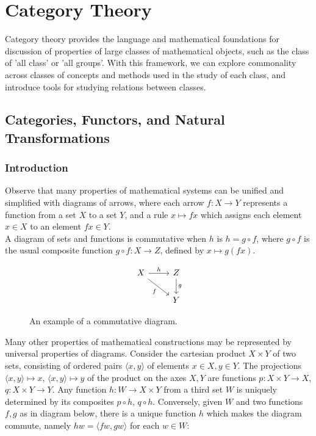 \section{Category Theory}

Category theory provides the language and mathematical foundations for discussion of properties of large classes of mathematical objects, such as the class of 'all class' or 'all groups'. With this framework, we can explore commonality across classes of concepts and methods used in the study of each class, and introduce tools for studying relations between classes.

\subsection{Categories, Functors, and Natural Transformations}

\subsubsection{Introduction}

Observe that many properties of mathematical systems can be unified and simplified with diagrams of arrows, where each arrow $f: X \rightarrow Y$ represents a function from a set $X$ to a set $Y$, and a rule $x \mapsto fx$ which assigns each element $x \in X$ to an element $fx \in Y$.\\

A diagram of sets and functions is commutative when $h$ is $h = g \circ f$, where $g \circ f$ is the usual composite function $g \circ f: X \rightarrow Z$, defined by $x \mapsto g(fx)$.

\begin{figure}[H]
\centering
\[\begin{tikzcd}
X \arrow[swap]{dr}{f} \arrow{r}{h} & Z \arrow{d}{g} \\
& Y
\end{tikzcd}
\]
\caption{An example of a commutative diagram.}
\end{figure}

Many other properties of mathematical constructions may be represented by universal properties of diagrams. Consider the cartesian product $X \times Y$ of two sets, consisting of ordered pairs $\langle x, y \rangle$ of elements $x\in X, y\in Y$. The projections $\langle x, y \rangle \mapsto x$, $\langle x, y \rangle \mapsto y$ of the product on the axes $X, Y$ are functions $p: X \times Y \rightarrow X$, $q: X \times Y \rightarrow Y$. Any function $h: W \rightarrow X \times Y$ from a third set $W$ is uniquely determined by its composites $p \circ h$, $q \circ h$. Conversely, given $W$ and two functions $f, g$ as in diagram below, there is a unique function $h$ which makes the diagram commute, namely $hw = \langle fw, gw \rangle$ for each $w \in W$:

